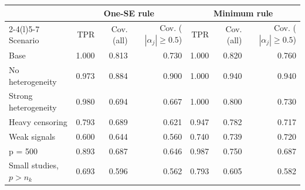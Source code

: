 \begin{tabular}{@{}lrrrrrr@{}}
\toprule
& \multicolumn{3}{c}{One-SE rule} & \multicolumn{3}{c}{Minimum rule} \\
\cmidrule(lr){2-4}\cmidrule(l){5-7}
Scenario & TPR & Cov. (all) & Cov. ($|\alpha_j|\ge 0.5$) & TPR & Cov. (all) & Cov. ($|\alpha_j|\ge 0.5$) \\
\midrule
Base & 1.000 & 0.813 & 0.730 & 1.000 & 0.820 & 0.760 \\
No heterogeneity & 0.973 & 0.884 & 0.900 & 1.000 & 0.940 & 0.940 \\
Strong heterogeneity & 0.980 & 0.694 & 0.667 & 1.000 & 0.800 & 0.730 \\
Heavy censoring & 0.793 & 0.689 & 0.621 & 0.947 & 0.782 & 0.717 \\
Weak signals & 0.600 & 0.644 & 0.560 & 0.740 & 0.739 & 0.720 \\
p = 500 & 0.893 & 0.687 & 0.646 & 0.987 & 0.750 & 0.687 \\
Small studies, $p>n_k$ & 0.693 & 0.596 & 0.562 & 0.793 & 0.605 & 0.582 \\
\bottomrule
\end{tabular}
